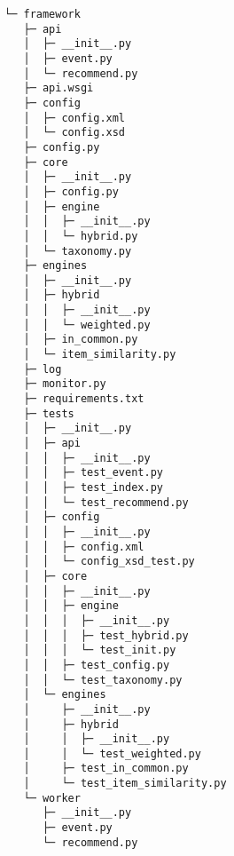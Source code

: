 \begin{codebox}
\begin{verbatim}
└─ framework
   ├─ api
   │  ├─ __init__.py
   │  ├─ event.py
   │  └─ recommend.py
   ├─ api.wsgi
   ├─ config
   │  ├─ config.xml
   │  └─ config.xsd
   ├─ config.py
   ├─ core
   │  ├─ __init__.py
   │  ├─ config.py
   │  ├─ engine
   │  │  ├─ __init__.py
   │  │  └─ hybrid.py
   │  └─ taxonomy.py
   ├─ engines
   │  ├─ __init__.py
   │  ├─ hybrid
   │  │  ├─ __init__.py
   │  │  └─ weighted.py
   │  ├─ in_common.py
   │  └─ item_similarity.py
   ├─ log
   ├─ monitor.py
   ├─ requirements.txt
   ├─ tests
   │  ├─ __init__.py
   │  ├─ api
   │  │  ├─ __init__.py
   │  │  ├─ test_event.py
   │  │  ├─ test_index.py
   │  │  └─ test_recommend.py
   │  ├─ config
   │  │  ├─ __init__.py
   │  │  ├─ config.xml
   │  │  └─ config_xsd_test.py
   │  ├─ core
   │  │  ├─ __init__.py
   │  │  ├─ engine
   │  │  │  ├─ __init__.py
   │  │  │  ├─ test_hybrid.py
   │  │  │  └─ test_init.py
   │  │  ├─ test_config.py
   │  │  └─ test_taxonomy.py
   │  └─ engines
   │     ├─ __init__.py
   │     ├─ hybrid
   │     │  ├─ __init__.py
   │     │  └─ test_weighted.py
   │     ├─ test_in_common.py
   │     └─ test_item_similarity.py
   └─ worker
      ├─ __init__.py
      ├─ event.py
      └─ recommend.py

\end{verbatim}
\end{codebox}

